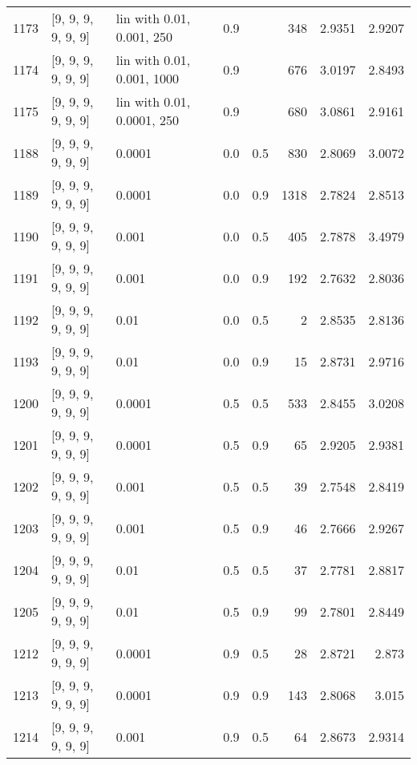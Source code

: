 \begin{longtable}{lllrrrrr}
 1173 & [9, 9, 9, 9, 9, 9] &   lin with 0.01, 0.001, 250 &      0.9 &     &  348 &   2.9351 &   2.9207 \\
 1174 & [9, 9, 9, 9, 9, 9] &  lin with 0.01, 0.001, 1000 &      0.9 &     &  676 &   3.0197 &   2.8493 \\
 1175 & [9, 9, 9, 9, 9, 9] &  lin with 0.01, 0.0001, 250 &      0.9 &     &  680 &   3.0861 &   2.9161 \\
 1188 & [9, 9, 9, 9, 9, 9] &                      0.0001 &      0.0 & 0.5 &  830 &   2.8069 &   3.0072 \\
 1189 & [9, 9, 9, 9, 9, 9] &                      0.0001 &      0.0 & 0.9 & 1318 &   2.7824 &   2.8513 \\
 1190 & [9, 9, 9, 9, 9, 9] &                       0.001 &      0.0 & 0.5 &  405 &   2.7878 &   3.4979 \\
 1191 & [9, 9, 9, 9, 9, 9] &                       0.001 &      0.0 & 0.9 &  192 &   2.7632 &   2.8036 \\
 1192 & [9, 9, 9, 9, 9, 9] &                        0.01 &      0.0 & 0.5 &    2 &   2.8535 &   2.8136 \\
 1193 & [9, 9, 9, 9, 9, 9] &                        0.01 &      0.0 & 0.9 &   15 &   2.8731 &   2.9716 \\
 1200 & [9, 9, 9, 9, 9, 9] &                      0.0001 &      0.5 & 0.5 &  533 &   2.8455 &   3.0208 \\
 1201 & [9, 9, 9, 9, 9, 9] &                      0.0001 &      0.5 & 0.9 &   65 &   2.9205 &   2.9381 \\
 1202 & [9, 9, 9, 9, 9, 9] &                       0.001 &      0.5 & 0.5 &   39 &   2.7548 &   2.8419 \\
 1203 & [9, 9, 9, 9, 9, 9] &                       0.001 &      0.5 & 0.9 &   46 &   2.7666 &   2.9267 \\
 1204 & [9, 9, 9, 9, 9, 9] &                        0.01 &      0.5 & 0.5 &   37 &   2.7781 &   2.8817 \\
 1205 & [9, 9, 9, 9, 9, 9] &                        0.01 &      0.5 & 0.9 &   99 &   2.7801 &   2.8449 \\
 1212 & [9, 9, 9, 9, 9, 9] &                      0.0001 &      0.9 & 0.5 &   28 &   2.8721 &    2.873 \\
 1213 & [9, 9, 9, 9, 9, 9] &                      0.0001 &      0.9 & 0.9 &  143 &   2.8068 &    3.015 \\
 1214 & [9, 9, 9, 9, 9, 9] &                       0.001 &      0.9 & 0.5 &   64 &   2.8673 &   2.9314 \\

\end{longtable}
